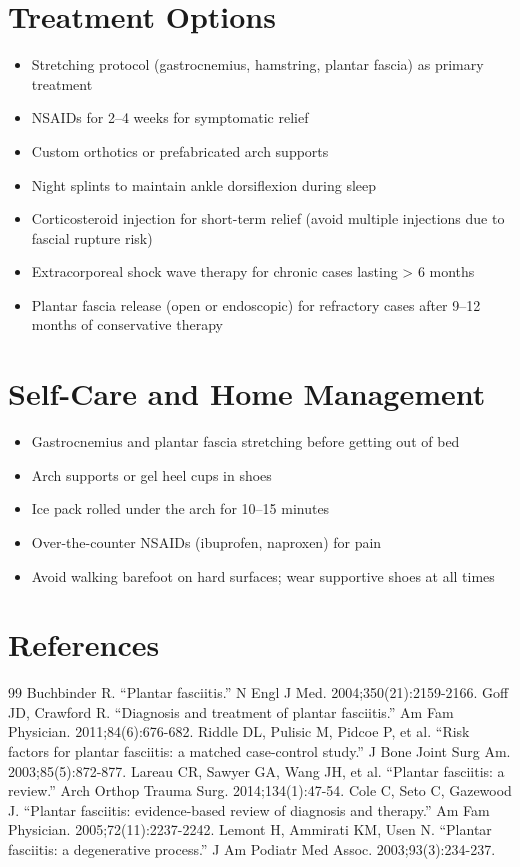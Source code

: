 \section*{Treatment Options}
\begin{itemize}
  \item Stretching protocol (gastrocnemius, hamstring, plantar fascia) as primary treatment
  \item NSAIDs for 2--4 weeks for symptomatic relief
  \item Custom orthotics or prefabricated arch supports
  \item Night splints to maintain ankle dorsiflexion during sleep
  \item Corticosteroid injection for short-term relief (avoid multiple injections due to fascial rupture risk)
  \item Extracorporeal shock wave therapy for chronic cases lasting > 6 months
  \item Plantar fascia release (open or endoscopic) for refractory cases after 9--12 months of conservative therapy
\end{itemize}

\section*{Self-Care and Home Management}
\begin{itemize}
  \item Gastrocnemius and plantar fascia stretching before getting out of bed
  \item Arch supports or gel heel cups in shoes
  \item Ice pack rolled under the arch for 10--15 minutes
  \item Over-the-counter NSAIDs (ibuprofen, naproxen) for pain
  \item Avoid walking barefoot on hard surfaces; wear supportive shoes at all times
\end{itemize}

\section*{References}
\begin{thebibliography}{99}
 Buchbinder R. ``Plantar fasciitis.'' N Engl J Med. 2004;350(21):2159-2166.
 Goff JD, Crawford R. ``Diagnosis and treatment of plantar fasciitis.'' Am Fam Physician. 2011;84(6):676-682.
 Riddle DL, Pulisic M, Pidcoe P, et al. ``Risk factors for plantar fasciitis: a matched case-control study.'' J Bone Joint Surg Am. 2003;85(5):872-877.
 Lareau CR, Sawyer GA, Wang JH, et al. ``Plantar fasciitis: a review.'' Arch Orthop Trauma Surg. 2014;134(1):47-54.
 Cole C, Seto C, Gazewood J. ``Plantar fasciitis: evidence-based review of diagnosis and therapy.'' Am Fam Physician. 2005;72(11):2237-2242.
 Lemont H, Ammirati KM, Usen N. ``Plantar fasciitis: a degenerative process.'' J Am Podiatr Med Assoc. 2003;93(3):234-237.
\end{thebibliography}
